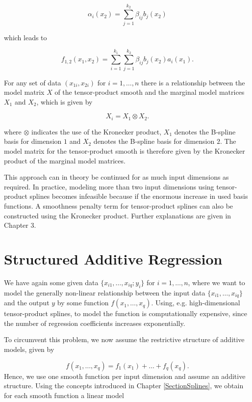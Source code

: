 \documentclass[10pt,a4paper]{article}
\begin{document}
$$\alpha_i(x_2) = \sum_{j=1}^{k_2} \beta_{ij} b_j(x_2)$$

which leads to

$$f_{1,2}(x_1, x_2) = \sum_{i=1}^{k_1} \sum_{j=1}^{k_2} \beta_{ij} b_j(x_2) a_i(x_1).$$

For any set of data $(x_{1i}, x_{2i})$ for $i = 1, \dots, n$ there is a relationship between the model matrix $X$ of the tensor-product smooth and the marginal model matrices $X_1$ and $X_2$, which is given by 

$$X_i = X_1 \otimes X_2.$$

where $\otimes$ indicates the use of the Kronecker product, $X_1$ denotes the B-spline basis for dimension $1$ and $X_2$ denotes the B-spline basis for dimension $2$. \cite{wood2006GAM} The model matrix for the tensor-product smooth is therefore given by the Kronecker product of the marginal model matrices. 

This approach can in theory be continued for as much input dimensions as required. In practice, modeling more than two input dimensions using tensor-product splines becomes infeasible because if the enormous increase in used basis functions. A smoothness penalty term for tensor-product splines can also be constructed using the Kronecker product. Further explanations are given in Chapter 3.

\section{Structured Additive Regression}

We have again some given data $\{x_{i1}, \dots, x_{iq}; y_i\}$ for $i = 1, \dots, n$, where we want to model the generally non-linear relationship between the input data $\{x_{i1}, \dots, x_{iq}\}$ and the output $y$ by some function $f(x_1, \dots, x_q)$.  Using, e.g. high-dimensional tensor-product splines, to model the function is computationally expensive, since the number of regression coefficients increases exponentially.

To circumvent this problem, we now assume the restrictive structure of additive models, given by

\begin{equation} \label{addRegBaseEquation}
	f(x_1, \dots, x_q) = f_1(x_1) + \dots + f_q(x_q). 
\end{equation}
Hence, we use one smooth function per input dimension and assume an additive structure. \cite{fahrmeir2013regression} Using the concepts introduced in Chapter \ref{SectionSplines}, we obtain for each smooth function a linear model
\end{document}
